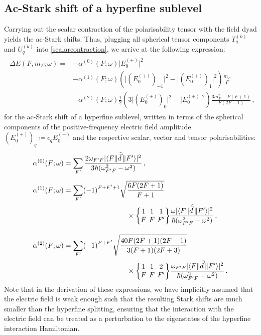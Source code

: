 \documentclass[../Thesis-IJspeert.tex]{subfiles}
\begin{document}
\subsection{Ac-Stark shift of a hyperfine sublevel}
Carrying out the scalar contraction of the polarisability tensor with the field dyad yields the ac-Stark shifts. Thus, plugging all spherical tensor components $T^{(k)}_q$ and $U^{(k)}_q$ into \autoref{scalarcontraction}, we arrive at the following expression:
\begin{align}
\label{acStarkHyperfineShifts}
\begin{split}
	\Delta E\left(F,m_F;\omega\right) = &- \alpha^{(0)}\left(F;\omega\right) \lvert E_0^{(+)}\rvert ^2 \\&- \alpha^{(1)} \left(F;\omega\right)   \left( \lvert (E_0^{(+)})_{-1}\rvert ^2 - \lvert (E_0^{(+)})_{1}\rvert ^2  \right)    \frac{m_F}{F}   \\&- \alpha^{(2)}\left(F;\omega\right)\frac{1}{2}\left(3\lvert (E_{0}^{(+)})_0 \rvert ^2 - \lvert E_0^{(+)}\rvert ^2 \right) \frac{3m_F^2-F\left(F+1\right)}{F\left(2F-1\right)} \,,
\end{split}
\end{align}
for the ac-Stark shift of a hyperfine sublevel, written in terms of the spherical components of the positive-frequency electric field amplitude $(E_0^{(+)})_q\coloneqq{\epsilon}_q E_0^{(+)}$ and the respective scalar, vector and tensor polarisabilities:
\begin{align}
\label{Ftensorpolarisabilities}
\begin{split}
 \alpha^{(0)}\left(F;\omega\right) &= \sum_{F'} \frac{2\omega_{F'F} \lvert \langle{F}\| \hat{\vec{d}}\, \|{F'}\rangle\rvert^2}{3\hbar\left(\omega_{F'F}^2-\omega^2\right)}\,, \\[0.5em] \alpha^{(1)}\left(F;\omega\right) &= \sum_{F'}  \left(-1\right)^{F+F'+1}\sqrt{\frac{6F\left(2F+1\right)}{F+1}}  \\ &\hspace{9em}\times\tj{1}{1}{1}{F}{F}{F'} \frac{\omega \lvert \langle{F}\|  \hat{\vec{d}}\,  \|{F'}\rangle\rvert^2}{\hbar\left(\omega_{F'F}^2-\omega^2\right)}\,, \\[1em] \alpha^{(2)}\left(F;\omega\right) &= \sum_{F'}  \left(-1\right)^{F+F'}\sqrt{\frac{40F\left(2F+1\right)\left(2F-1\right)}{3\left(F+1\right)\left(2F+3\right)}} \\ &\hspace{9em}\times \tj{1}{1}{2}{F}{F}{F'}  \frac{\omega_{F'F} \lvert \langle{F}\|  \hat{\vec{d}}\,  \|{F'}\rangle\rvert^2}{\hbar\left(\omega_{F'F}^2-\omega^2\right)}  \,.
\end{split}    
\end{align}
Note that in the derivation of these expressions, we have implicitly assumed that the electric field is weak enough such that the resulting Stark shifts are much smaller than the hyperfine splitting, ensuring that the interaction with the electric field can be treated as a perturbation to the eigenstates of the hyperfine interaction Hamiltonian.
\end{document}
